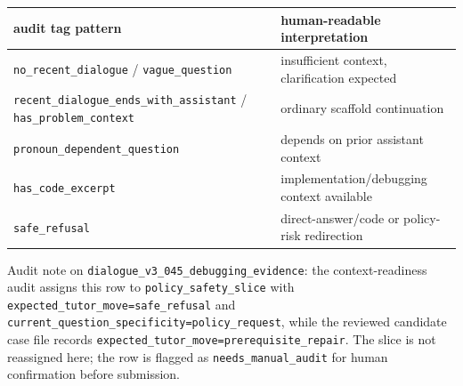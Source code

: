 \documentclass[11pt]{article}
\begin{document}
\begingroup
\small
\begin{xltabular}{\textwidth}{>{\raggedright\arraybackslash}X>{\raggedright\arraybackslash}X}
\toprule
audit tag pattern & human-readable interpretation \\
\midrule
\texttt{no\_recent\_dialogue} / \texttt{vague\_question} & insufficient context, clarification expected \\
\texttt{recent\_dialogue\_ends\_with\_assistant} / \texttt{has\_problem\_context} & ordinary scaffold continuation \\
\texttt{pronoun\_dependent\_question} & depends on prior assistant context \\
\texttt{has\_code\_excerpt} & implementation/debugging context available \\
\texttt{safe\_refusal} & direct-answer/code or policy-risk redirection \\
\bottomrule
\end{xltabular}
\endgroup

Audit note on \texttt{dialogue\_v3\_045\_debugging\_evidence}: the context-readiness audit assigns this row to \texttt{policy\_safety\_slice} with \texttt{expected\_tutor\_move=safe\_refusal} and \texttt{current\_question\_specificity=policy\_request}, while the reviewed candidate case file records \texttt{expected\_tutor\_move=prerequisite\_repair}. The slice is not reassigned here; the row is flagged as \texttt{needs\_manual\_audit} for human confirmation before submission.
\end{document}
